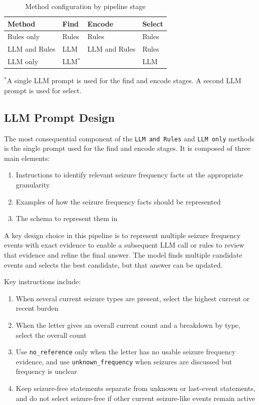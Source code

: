 \documentclass[conference]{IEEEtran}
\begin{document}
\begin{table}[!t]
\caption{Method configuration by pipeline stage}
\label{tab:method}
\centering
\begin{tabularx}{\linewidth}{Ylll}
\toprule
\textbf{Method} & \textbf{Find} & \textbf{Encode} & \textbf{Select} \\
\midrule
Rules only & Rules & Rules & Rules \\
LLM and Rules & LLM & LLM and Rules & Rules \\
LLM only & {LLM$^\ast$} & & LLM \\
\bottomrule
\end{tabularx}

\vspace*{2pt}
\begin{minipage}{\linewidth}
\raggedright\footnotesize
$^\ast$A single LLM prompt is used for the find and encode stages. A second LLM prompt is used for select. 
\end{minipage}
\end{table}

\subsection{LLM Prompt Design}

The most consequential component of the \texttt{LLM and Rules}
and \texttt{LLM only} methods is the single prompt used for the
find and encode stages. It is composed of three main 
elements: 
\begin{enumerate}
\item Instructions to identify relevant seizure 
frequency facts at the appropriate granularity
\item Examples of how the seizure frequency facts should
be represented
\item The schema to represent them in
\end{enumerate}

A key design choice in this pipeline is to represent multiple 
seizure frequency events with exact evidence to enable 
a subsequent LLM call or rules to review that evidence 
and refine the final answer. The model finds multiple 
candidate events and selects the best candidate, but that
answer can be updated.

Key instructions include: 

\begin{enumerate}
\item When several current seizure types are present, 
select the highest current or recent burden
\item When the letter gives an overall current count and 
a breakdown by type, select the overall count
\item Use \texttt{no\_reference} only when the letter has 
no usable seizure frequency evidence, and use
\texttt{unknown\_frequency} when seizures are discussed 
but frequency is unclear
\item Keep seizure-free statements separate from unknown 
or last-event statements, and do not select seizure-free if 
other current seizure-like events 
remain active
\end{enumerate}
\end{document}
